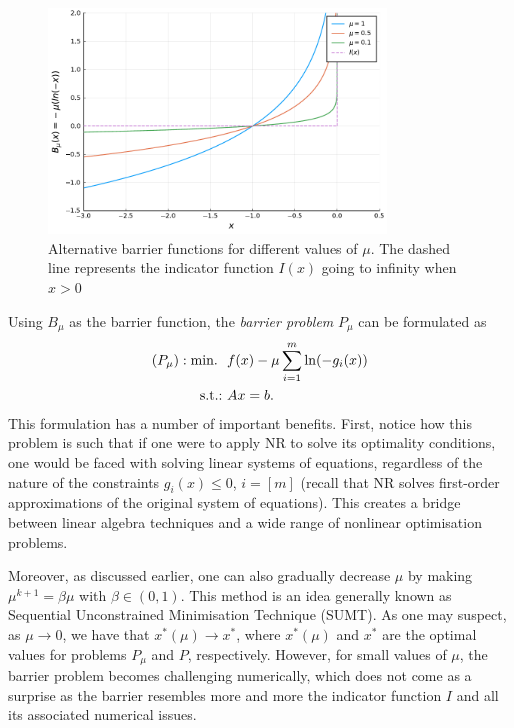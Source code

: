\begin{figure}
	\includegraphics[width=0.8\textwidth]{chapters/chapter_7/figures/different_mu.pdf}
	\caption{Alternative barrier functions for different values of $\mu$. The dashed line represents the indicator function $I(x)$ going to infinity when $x > 0$} \label{p1c7:fig:barrier_function}
\end{figure}

Using $B_\mu$ as the barrier function, the \emph{barrier problem} $P_\mu$ can be formulated as
	\begin{align*}
		(P_\mu) : \mathop{\text{min.~}} \ &f(x) - \mu \sum_{i=1}^m\ln(-g_i(x)) \\
		\mathop{\text{s.t.:~}} & Ax = b.
	\end{align*}
	This formulation has a number of important benefits. First, notice how this problem is such that if one were to apply NR to solve its optimality conditions, one would be faced with solving linear systems of equations, regardless of the nature of the constraints $g_i(x) \le 0$, $i = [m]$ (recall that NR solves first-order approximations of the original system of equations). This creates a bridge between linear algebra techniques and a wide range of nonlinear optimisation problems. 
	
Moreover, as discussed earlier, one can also gradually decrease $\mu$ by making $\mu^{k+1} = \beta\mu$ with $\beta \in (0,1)$. This method is an idea generally known as Sequential Unconstrained Minimisation Technique (SUMT). As one may suspect, as $\mu \rightarrow 0$, we have that $x^*(\mu) \rightarrow x^*$, where $x^*(\mu)$ and $x^*$ are the optimal values for problems $P_\mu$ and $P$, respectively. However, for small values of $\mu$, the barrier problem becomes challenging numerically, which does not come as a surprise as the barrier resembles more and more the indicator function $I$ and all its associated numerical issues. 

